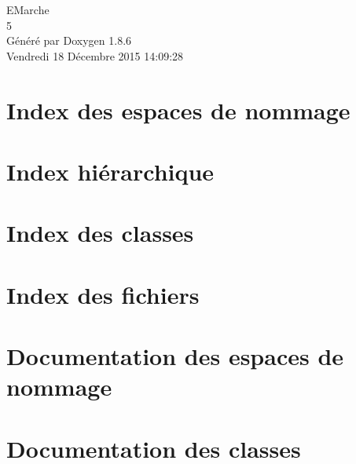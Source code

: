 \documentclass[twoside]{book}
\newcommand{\clearemptydoublepage}{%
  \newpage{\pagestyle{empty}\cleardoublepage}%
}
\begin{document}
\hypersetup{pageanchor=false}
\begin{titlepage}
\vspace*{7cm}
\begin{center}%
{\Large E\-Marche \\[1ex]\large 5 }\\
\vspace*{1cm}
{\large Généré par Doxygen 1.8.6}\\
\vspace*{0.5cm}
{\small Vendredi 18 Décembre 2015 14:09:28}\\
\end{center}
\end{titlepage}
\clearemptydoublepage
\tableofcontents
\clearemptydoublepage
{}
\hypersetup{pageanchor=true}

\chapter{Index des espaces de nommage}

\chapter{Index hiérarchique}

\chapter{Index des classes}

\chapter{Index des fichiers}

\chapter{Documentation des espaces de nommage}

\chapter{Documentation des classes}































\end{document}
